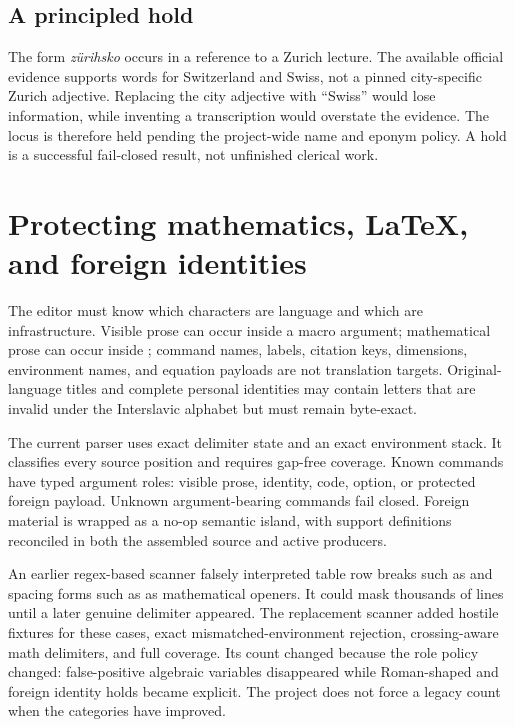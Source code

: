 \documentclass[11pt,a4paper]{article}
\newcommand{\term}[1]{\textit{#1}}
\newcommand{\code}[1]{\texttt{\detokenize{#1}}}
\begin{document}
\subsection{A principled hold}

The form \term{zürihsko} occurs in a reference to a Zurich lecture. The available official evidence supports words for Switzerland and Swiss, not a pinned city-specific Zurich adjective. Replacing the city adjective with ``Swiss'' would lose information, while inventing a transcription would overstate the evidence. The locus is therefore held pending the project-wide name and eponym policy. A hold is a successful fail-closed result, not unfinished clerical work.

\section{Protecting mathematics, \LaTeX{}, and foreign identities}

The editor must know which characters are language and which are infrastructure. Visible prose can occur inside a macro argument; mathematical prose can occur inside \code{\text\{...\}}; command names, labels, citation keys, dimensions, environment names, and equation payloads are not translation targets. Original-language titles and complete personal identities may contain letters that are invalid under the Interslavic alphabet but must remain byte-exact.

The current parser uses exact delimiter state and an exact environment stack. It classifies every source position and requires gap-free coverage. Known commands have typed argument roles: visible prose, identity, code, option, or protected foreign payload. Unknown argument-bearing commands fail closed. Foreign material is wrapped as a no-op semantic island, with support definitions reconciled in both the assembled source and active producers.

An earlier regex-based scanner falsely interpreted table row breaks such as \code{\\(} and spacing forms such as \code{\\[0.3em]} as mathematical openers. It could mask thousands of lines until a later genuine delimiter appeared. The replacement scanner added hostile fixtures for these cases, exact mismatched-environment rejection, crossing-aware math delimiters, and full coverage. Its count changed because the role policy changed: false-positive algebraic variables disappeared while Roman-shaped and foreign identity holds became explicit. The project does not force a legacy count when the categories have improved.
\end{document}
